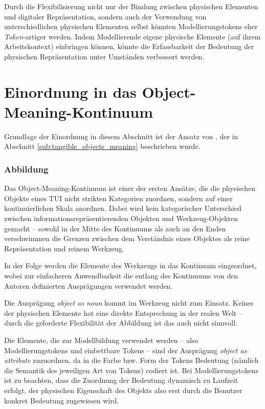 Durch die Flexibilisierung nicht nur der Bindung zwischen physischen Elementen und digitaler Repräsentation, sondern auch der Verwendung von unterschiedlichen physischen Elementen selbst könnten Modellierungstokens eher \emph{Token}-artiger werden. Indem Modellierende eigene physische Elemente (auf ihrem Arbeitskontext) einbringen können, könnte die Erfassbarkeit der Bedeutung der physischen Repräsentation unter Umständen verbessert werden.


\section{Einordnung in das Object-Meaning-Kontinuum} %
\label{sec:einordnung_in_das_object_meaning_kontinuum}

Grundlage der Einordnung in diesem Abschnitt ist der Ansatz von \citet{Underkoffler99}, der in Abschnitt \ref{sub:tangible_objects_meaning} beschrieben wurde.

\subsubsection{Abbildung} 

Das Object-Meaning-Kontinuum ist einer der ersten Ansätze, die die physischen Objekte eines \gls{TUI} nicht strikten Kategorien zuordnen, sondern auf einer kontinuierlichen Skala anordnen. Dabei wird kein kategorischer Unterschied zwischen informationsrepräsentierenden Objekten und Werkzeug-Objekten gemacht -- sowohl in der Mitte des Kontinuums als auch an den Enden verschwimmen die Grenzen zwischen dem Verständnis eines Objektes als reine Repräsentation und reinem Werkzeug. 

In der Folge werden die Elemente des Werkzeugs in das Kontinuum eingeordnet, wobei zur einfacheren Anwendbarkeit die entlang des Kontinuums von den Autoren definierten Ausprägungen verwendet werden.

Die Ausprägung \emph{object as noun} kommt im Werkzeug nicht zum Einsatz. Keines der physischen Elemente hat eine direkte Entsprechung in der realen Welt -- durch die geforderte Flexibilität der Abbildung ist das auch nicht sinnvoll. 

Die Elemente, die zur Modellbildung verwendet werden -- also Modellierungstokens und einbettbare Tokens -- sind der Ausprägung \emph{object as attribute} zuzuordnen, da in die Farbe bzw. Form der Tokens Bedeutung (nämlich die Semantik des jeweiligen Art von Tokens) codiert ist. Bei Modellierungstokens ist zu beachten, dass die Zuordnung der Bedeutung dynamisch zu Laufzeit erfolgt, der physischen Eigenschaft des Objekts also erst durch die Benutzer konkret Bedeutung zugewiesen wird.

